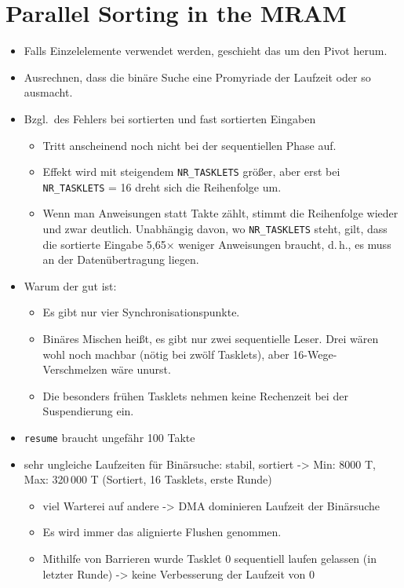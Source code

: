 \chapter{Parallel Sorting in the MRAM}
\label{sec:par}

\begin{itemize}
	\item
	Falls Einzelelemente verwendet werden, geschieht das um den Pivot herum.

	\item
	Ausrechnen, dass die binäre Suche eine Promyriade der Laufzeit oder so ausmacht.

	\item
	Bzgl.\ des Fehlers bei sortierten und fast sortierten Eingaben
	\begin{itemize}
		\item
		Tritt anscheinend noch nicht bei der sequentiellen Phase auf.

		\item
		Effekt wird mit steigendem \lstinline|NR_TASKLETS| größer, aber erst bei \lstinline|NR_TASKLETS| = 16 dreht sich die Reihenfolge um.

		\item
		Wenn man Anweisungen statt Takte zählt, stimmt die Reihenfolge wieder und zwar deutlich.
		Unabhängig davon, wo \lstinline|NR_TASKLETS| steht, gilt, dass die sortierte Eingabe 5,65× weniger Anweisungen braucht, d.\,h., es muss an der Datenübertragung liegen.
	\end{itemize}

	\item
	Warum der \MS{} gut ist:
	\begin{itemize}
		\item
		Es gibt nur vier Synchronisationspunkte.

		\item
		Binäres Mischen heißt, es gibt nur zwei sequentielle Leser. Drei wären wohl noch machbar (nötig bei zwölf Tasklets), aber 16-Wege-Verschmelzen wäre unurst.

		\item
		Die besonders frühen Tasklets nehmen keine Rechenzeit bei der Suspendierung ein.
	\end{itemize}

	\item
	\lstinline|resume| braucht ungefähr 100 Takte

	\item
	sehr ungleiche Laufzeiten für Binärsuche:
	stabil, sortiert -> Min: 8000 T, Max: 320\,000 T (Sortiert, 16 Tasklets, erste Runde)
	\begin{itemize}
		\item
		viel Warterei auf andere -> DMA dominieren Laufzeit der Binärsuche

		\item
		Es wird immer das alignierte Flushen genommen.

		\item
		Mithilfe von Barrieren wurde Tasklet 0 sequentiell laufen gelassen (in letzter Runde) -> keine Verbesserung der Laufzeit von 0
	\end{itemize}
\end{itemize}

